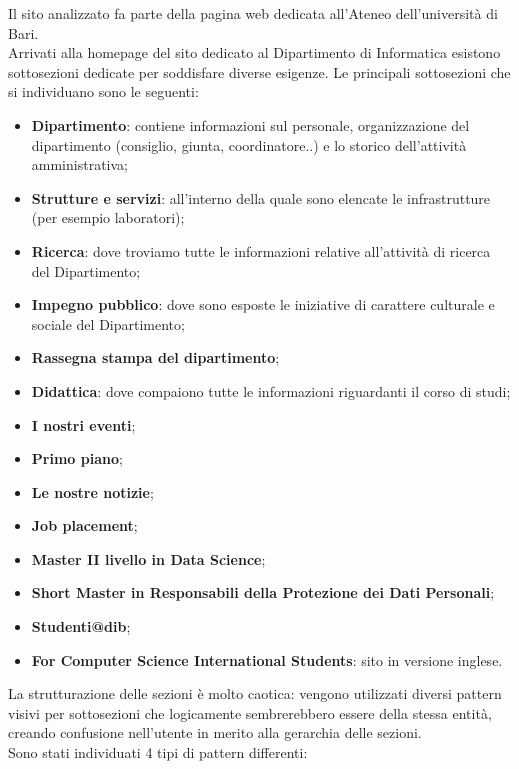 Il sito analizzato fa parte della pagina web dedicata all'Ateneo dell'università di Bari. \\
Arrivati alla homepage del sito dedicato al Dipartimento di Informatica esistono sottosezioni dedicate per soddisfare diverse esigenze.
Le principali sottosezioni che si individuano sono le seguenti:
	\begin{itemize}
		\item \textbf{Dipartimento}: contiene informazioni sul personale, organizzazione del dipartimento (consiglio, giunta, coordinatore..) e 		lo storico dell'attività amministrativa;
		\item \textbf{Strutture e servizi}: all'interno della quale sono elencate le infrastrutture (per esempio laboratori);
		\item \textbf{Ricerca}: dove troviamo tutte le informazioni relative all'attività di ricerca del Dipartimento;
		\item \textbf{Impegno pubblico}: dove sono esposte le iniziative di carattere culturale e sociale del Dipartimento;
		\item \textbf{Rassegna stampa del dipartimento};
		\item \textbf{Didattica}: dove compaiono tutte le informazioni riguardanti il corso di studi;
		\item \textbf{I nostri eventi};
		\item \textbf{Primo piano};
		\item \textbf{Le nostre notizie};
		\item \textbf{Job placement};
		\item \textbf{Master II livello in Data Science};
		\item \textbf{Short Master in Responsabili della Protezione dei Dati Personali};
		\item \textbf{Studenti@dib};
		\item \textbf{For Computer Science International Students}: sito in versione inglese.
	\end{itemize}
La strutturazione delle sezioni è molto caotica: vengono utilizzati diversi pattern visivi per sottosezioni che logicamente sembrerebbero essere della stessa entità, creando confusione nell'utente in merito alla gerarchia delle sezioni.\\
Sono stati individuati 4 tipi di pattern differenti:
